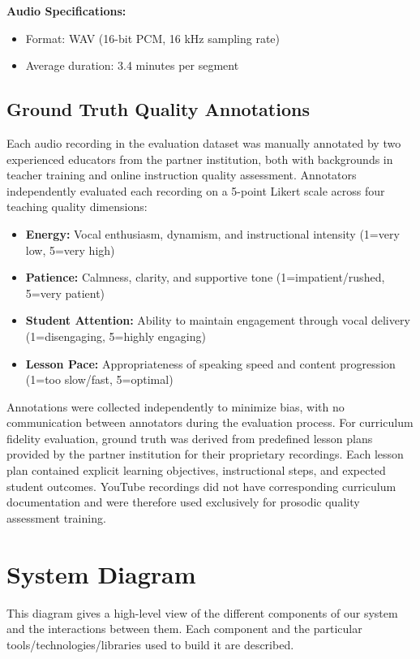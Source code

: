 \textbf{Audio Specifications:}
\begin{itemize}
    \item Format: WAV (16-bit PCM, 16 kHz sampling rate)
    \item Average duration: 3.4 minutes per segment
\end{itemize}

\subsection{Ground Truth Quality Annotations}
Each audio recording in the evaluation dataset was manually annotated by two experienced educators from the partner institution, both with backgrounds in teacher training and online instruction quality assessment. Annotators independently evaluated each recording on a 5-point Likert scale across four teaching quality dimensions:
\begin{itemize}
    \item \textbf{Energy:} Vocal enthusiasm, dynamism, and instructional intensity (1=very low, 5=very high)
    \item \textbf{Patience:} Calmness, clarity, and supportive tone (1=impatient/rushed, 5=very patient)
    \item \textbf{Student Attention:} Ability to maintain engagement through vocal delivery (1=disengaging, 5=highly engaging)
    \item \textbf{Lesson Pace:} Appropriateness of speaking speed and content progression (1=too slow/fast, 5=optimal)
\end{itemize}
Annotations were collected independently to minimize bias, with no communication between annotators during the evaluation process. 
For curriculum fidelity evaluation, ground truth was derived from predefined lesson plans provided by the partner institution for their proprietary recordings. Each lesson plan contained explicit learning objectives, instructional steps, and expected student outcomes. YouTube recordings did not have corresponding curriculum documentation and were therefore used exclusively for prosodic quality assessment training.

\section{System Diagram}
This diagram gives a high-level view of the different components of our system and the interactions between them. Each component and the particular tools/technologies/libraries used to build it are described.

